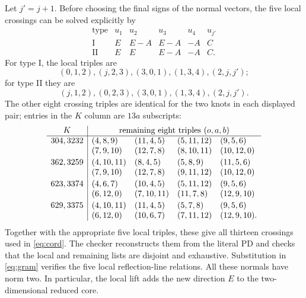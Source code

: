 \documentclass[11pt]{article}
\begin{document}
Let $j'=j+1$. Before choosing the final signs of the normal vectors,
the five local crossings can be solved explicitly by
\[
\begin{array}{c|ccccc}
\text{type}&u_1&u_2&u_3&u_4&u_{j'}\\\hline
\mathrm I&E&E-A&E-A&-A&C\\
\mathrm{II}&E&E&E-A&-A&C.
\end{array}
\]
For type I, the local triples are
\[
 (0,1,2),(j,2,3),(3,0,1),(1,3,4),(2,j,j');
\]
for type II they are
\[
 (j,1,2),(0,2,3),(3,0,1),(1,3,4),(2,j,j').
\]
The other eight crossing triples are identical for the two knots
in each displayed pair; entries in the $K$ column are $13a$ subscripts:
\[
\begin{array}{c|llll}
K&\multicolumn{4}{c}{\text{remaining eight triples }(o,a,b)}\\\hline
304,3232&(4,8,9)&(11,4,5)&(5,11,12)&(9,5,6)\\
        &(7,9,10)&(12,7,8)&(8,10,11)&(10,12,0)\\[2pt]
362,3259&(4,10,11)&(8,4,5)&(5,8,9)&(11,5,6)\\
        &(7,9,10)&(12,7,8)&(9,11,12)&(10,12,0)\\[2pt]
623,3374&(4,6,7)&(10,4,5)&(5,11,12)&(9,5,6)\\
        &(6,12,0)&(7,10,11)&(11,7,8)&(12,9,10)\\[2pt]
629,3375&(4,10,11)&(11,4,5)&(5,7,8)&(9,5,6)\\
        &(6,12,0)&(10,6,7)&(7,11,12)&(12,9,10).
\end{array}
\]
Together with the appropriate five local triples, these give all
thirteen crossings used in \eqref{eq:cord}. The checker reconstructs
them from the literal PD and checks that the local and remaining
lists are disjoint and exhaustive.
Substitution in \eqref{eq:gram} verifies the five local reflection-line relations.
All these normals have norm two. In particular, the local lift adds
the new direction $E$ to the two-dimensional reduced core.
\end{document}

